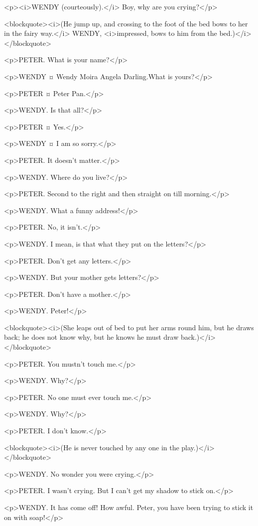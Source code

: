 <p><i>WENDY (courteously).</i> Boy, why are you crying?</p>

<blockquote><i>(He jump up, and crossing to the foot of the bed bows to her in the fairy way.</i> WENDY, <i>impressed, bows to him from the bed.)</i></blockquote>

<p>PETER. What is your name?</p>

<p>WENDY ¤
Wendy Moira Angela Darling.What is yours?</p>

<p>PETER ¤
Peter Pan.</p>

<p>WENDY. Is that all?</p>

<p>PETER ¤
Yes.</p>

<p>WENDY ¤
I am so sorry.</p>

<p>PETER. It doesn't matter.</p>

<p>WENDY. Where do you live?</p>

<p>PETER. Second to the right and then straight on till morning.</p>

<p>WENDY. What a funny address!</p>

<p>PETER. No, it isn't.</p>

<p>WENDY. I mean, is that what they put on the letters?</p>

<p>PETER. Don't get any letters.</p>

<p>WENDY. But your mother gets letters?</p>

<p>PETER. Don't have a mother.</p>

<p>WENDY. Peter!</p>

<blockquote><i>(She leaps out of bed to put her arms round him, but he draws back; he does not know why, but he knows he must draw back.)</i></blockquote>

<p>PETER. You mustn't touch me.</p>

<p>WENDY. Why?</p>

<p>PETER. No one must ever touch me.</p>

<p>WENDY. Why?</p>

<p>PETER. I don't know.</p>

<blockquote><i>(He is never touched by any one in the play.)</i></blockquote>

<p>WENDY. No wonder you were crying.</p>

<p>PETER. I wasn't crying. But I can't get my shadow to stick on.</p>

<p>WENDY. It has come off! How awful.
Peter, you have been trying to stick it on with soap!</p>

